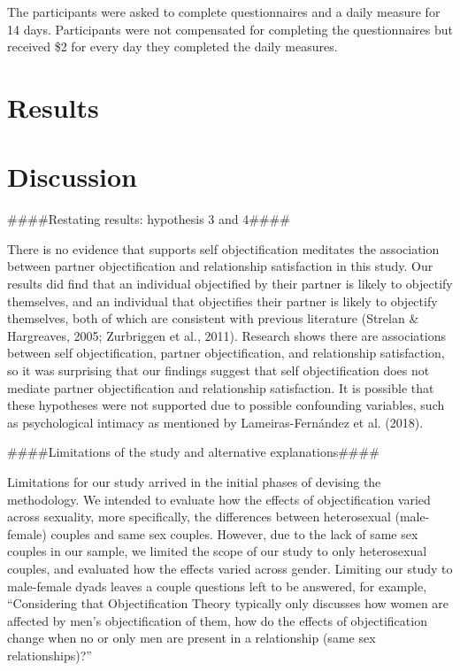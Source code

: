 \documentclass[
  man]{apa6}
\begin{document}
The participants were asked to complete questionnaires and a daily measure for 14 days. Participants were not compensated for completing the questionnaires but received \$2 for every day they completed the daily measures.

\hypertarget{results}{%
\section{Results}\label{results}}

\hypertarget{discussion}{%
\section{Discussion}\label{discussion}}

\#\#\#\#Restating results: hypothesis 3 and 4\#\#\#\#

There is no evidence that supports self objectification meditates the association between partner objectification and relationship satisfaction in this study. Our results did find that an individual objectified by their partner is likely to objectify themselves, and an individual that objectifies their partner is likely to objectify themselves, both of which are consistent with previous literature (Strelan \& Hargreaves, 2005; Zurbriggen et al., 2011). Research shows there are associations between self objectification, partner objectification, and relationship satisfaction, so it was surprising that our findings suggest that self objectification does not mediate partner objectification and relationship satisfaction. It is possible that these hypotheses were not supported due to possible confounding variables, such as psychological intimacy as mentioned by Lameiras-Fernández et al. (2018).

\#\#\#\#Limitations of the study and alternative explanations\#\#\#\#

Limitations for our study arrived in the initial phases of devising the methodology. We intended to evaluate how the effects of objectification varied across sexuality, more specifically, the differences between heterosexual (male-female) couples and same sex couples. However, due to the lack of same sex couples in our sample, we limited the scope of our study to only heterosexual couples, and evaluated how the effects varied across gender. Limiting our study to male-female dyads leaves a couple questions left to be answered, for example, ``Considering that Objectification Theory typically only discusses how women are affected by men's objectification of them, how do the effects of objectification change when no or only men are present in a relationship (same sex relationships)?''
\end{document}
